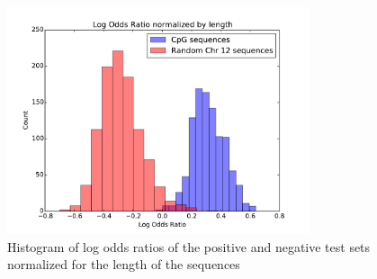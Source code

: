 \documentclass{acm_proc_article-sp}
\begin{document}
\begin{figure}[!b]
	\includegraphics[trim={0 0 2cm 0}, clip,width=3.5in]{histogram.pdf}
	\caption{Histogram of log odds ratios of the positive and negative test sets normalized for the length of the sequences}
	\label{fig:hist}
\end{figure}



%


%
%

\balancecolumns
\end{document}
